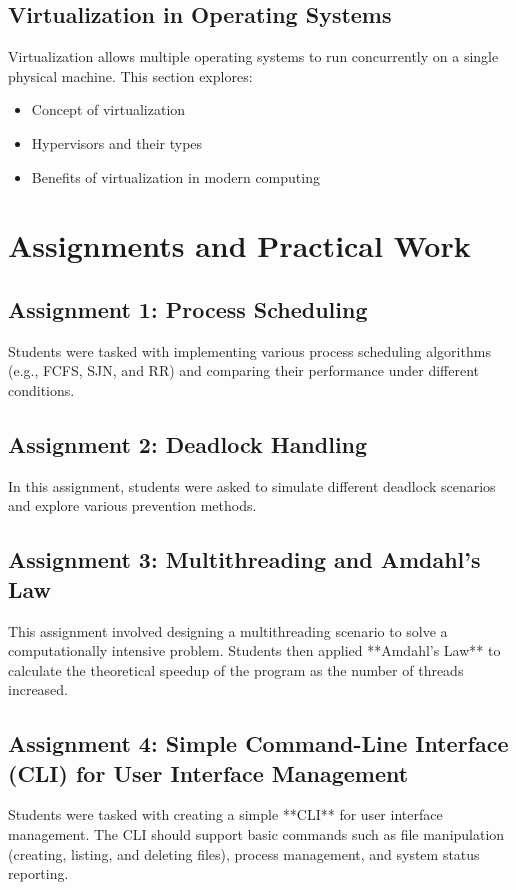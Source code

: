 \documentclass[12pt]{article}
\begin{document}
\subsection{Virtualization in Operating Systems}
Virtualization allows multiple operating systems to run concurrently on a single physical machine. This section explores:
\begin{itemize}
    \item Concept of virtualization
    \item Hypervisors and their types
    \item Benefits of virtualization in modern computing
\end{itemize}

\section{Assignments and Practical Work}
\subsection{Assignment 1: Process Scheduling}
Students were tasked with implementing various process scheduling algorithms (e.g., FCFS, SJN, and RR) and comparing their performance under different conditions.

\subsection{Assignment 2: Deadlock Handling}
In this assignment, students were asked to simulate different deadlock scenarios and explore various prevention methods.

\subsection{Assignment 3: Multithreading and Amdahl's Law}
This assignment involved designing a multithreading scenario to solve a computationally intensive problem. Students then applied **Amdahl's Law** to calculate the theoretical speedup of the program as the number of threads increased.

\subsection{Assignment 4: Simple Command-Line Interface (CLI) for User Interface Management}
Students were tasked with creating a simple **CLI** for user interface management. The CLI should support basic commands such as file manipulation (creating, listing, and deleting files), process management, and system status reporting.
\end{document}
